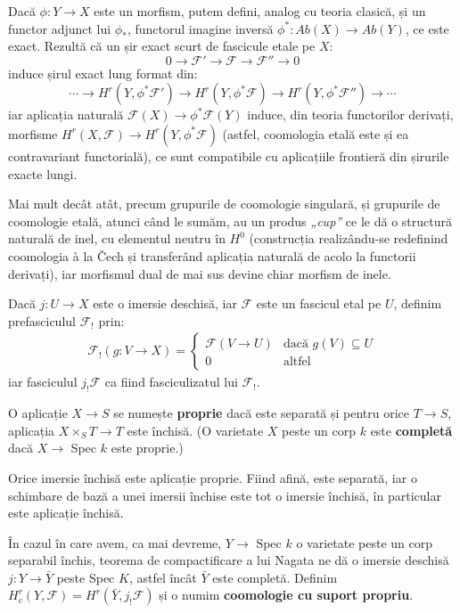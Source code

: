 \documentclass[13pt,openany,oneside]{book}
\begin{document}
Dacă $\phi:Y \rightarrow X$ este un morfism, putem defini, analog cu teoria clasică, și un functor adjunct lui $\phi_*$, functorul imagine inversă $\phi^* : Ab(X) \rightarrow Ab(Y)$, ce este exact. Rezultă că un șir exact scurt de fascicule etale pe $X$:
$$0 \rightarrow \mathcal{F}' \rightarrow \mathcal{F} \rightarrow \mathcal{F}'' \rightarrow 0$$
induce șirul exact lung format din:
$$\cdots \rightarrow H^r(Y,\phi^*\mathcal{F}') \rightarrow H^r(Y,\phi^*\mathcal{F}) \rightarrow H^r(Y,\phi^*\mathcal{F}'') \rightarrow \cdots$$
iar aplicația naturală $\mathcal{F}(X) \rightarrow \phi^*\mathcal{F}(Y)$ induce, din teoria functorilor derivați, morfisme $H^r(X,\mathcal{F}) \rightarrow H^r(Y,\phi^*\mathcal{F})$ (astfel, coomologia etală este și ea contravariant functorială), ce sunt compatibile cu aplicațiile frontieră din șirurile exacte lungi.

Mai mult decât atât, precum grupurile de coomologie singulară, și grupurile de coomologie etală, atunci când le sumăm, au un produs {\it„cup”} ce le dă o structură naturală de inel, cu elementul neutru în $H^0$ (construcția realizându-se redefinind coomologia à la Čech și transferând aplicația naturală de acolo la functorii derivați), iar morfismul dual de mai sus devine chiar morfism de inele.

Dacă $j :U \rightarrow X$ este o imersie deschisă, iar $\mathcal{F}$ este un fascicul etal pe $U$, definim prefasciculul $\mathcal{F}_!$ prin:
\begin{align*}
\mathcal{F}_!(g: V \rightarrow X) = \left\{
     \begin{array}{lr}
       \mathcal{F}(V \rightarrow U) & \text{dacă } g(V)\subseteq U\\
       0 & \text{altfel}
     \end{array}
   \right.
\end{align*}
iar fasciculul $j_!\mathcal{F}$ ca fiind fasciculizatul lui $\mathcal{F}_!$.

O aplicație $X \rightarrow S$ se numește {\bf proprie} dacă este separată și pentru orice $T \rightarrow S$, aplicația $X \times_S T \rightarrow T$ este închisă. (O varietate $X$ peste un corp $k$ este {\bf completă} dacă $X \rightarrow$ Spec $k$ este proprie.)

Orice imersie închisă este aplicație proprie. Fiind afină, este separată, iar o schimbare de bază a unei imersii închise este tot o imersie închisă, în particular este aplicație închisă.

În cazul în care avem, ca mai devreme, $Y \rightarrow$ Spec $k$ o varietate peste un corp separabil închis, teorema de compactificare a lui Nagata ne dă o imersie deschisă $j: Y \rightarrow \bar{Y}$ peste Spec $K$, astfel încât $\bar{Y}$ este completă. Definim $H^r_c(Y,\mathcal{F}) = H^r(\bar{Y},j_!\mathcal{F})$ și o numim {\bf coomologie cu suport propriu}.
\end{document}
